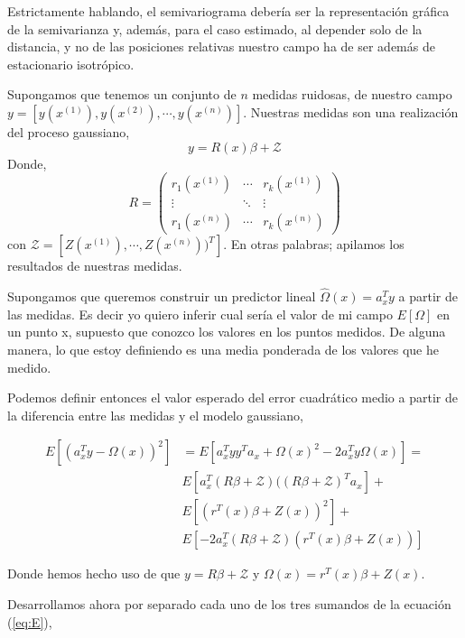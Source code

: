 \documentclass[10pt,a4paper]{report}
\begin{document}
Estrictamente hablando, el semivariograma debería ser la representación gráfica de la semivarianza y, además, para el caso estimado, al depender solo de la distancia, y no de las posiciones relativas nuestro campo ha de ser además de estacionario isotrópico.



Supongamos que tenemos un conjunto de $n$ medidas ruidosas, de nuestro campo $y = [y(x^{(1)}),y(x^{(2)}),\cdots, y(x^{(n)})]$. Nuestras medidas son una realización del proceso gaussiano,
\begin{equation}
y = R(x)\beta + \mathcal{Z}
\end{equation}
Donde,
\begin{equation}
R = \begin{pmatrix}
r_1(x^{(1)})&\cdots&r_k(x^{(1)})\\
\vdots &\ddots&\vdots\\
r_1(x^{(n)})&\cdots&r_k(x^{(n)})
\end{pmatrix}
\end{equation}
con $\mathcal{Z} = [Z(x^{(1)}),\cdots,Z(x^{(n)}))^T]$. En otras palabras; apilamos los resultados de nuestras medidas.

Supongamos que queremos construir un predictor lineal $\hat{\Omega}(x) = a_x^Ty$ a partir de las medidas. Es decir yo quiero inferir cual sería el valor de mi campo $E[\Omega]$ en un punto x, supuesto que conozco los valores en los puntos medidos. De alguna manera, lo que estoy definiendo es una media ponderada de los valores que he medido. 

Podemos definir entonces el valor esperado del error cuadrático medio a partir de la diferencia entre las medidas y el modelo gaussiano,

\begin{equation}\label{eq:E}
\begin{split}
E[(a_x^Ty-\Omega(x))^2] &= E[a_x^Tyy^Ta_x + \Omega(x)^2 - 2a_x^Ty\Omega(x)]=\\
&E[a_x^T(R\beta+\mathcal{Z})((R\beta+\mathcal{Z})^Ta_x] +\\
&E[(r^T(x)\beta+Z(x))^2] +\\
&E[-2a_x^T(R\beta+\mathcal{Z})(r^T(x)\beta+Z(x))]
\end{split}
\end{equation}

Donde hemos hecho uso de que $y = R\beta + \mathcal{Z}$  y $\Omega(x) = r^T(x)\beta +Z(x)$.

Desarrollamos ahora por separado cada uno de los tres sumandos de la ecuación (\ref{eq:E}),
\end{document}
